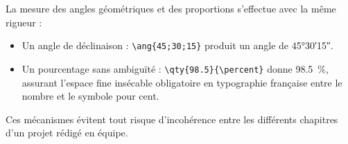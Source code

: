 La mesure des angles géométriques et des proportions s'effectue avec la même rigueur :
\begin{itemize}
  \item Un angle de déclinaison : \texttt{\textbackslash ang\{45;30;15\}} produit un angle de \ang{45;30;15}.
  \item Un pourcentage sans ambiguïté : \texttt{\textbackslash qty\{98.5\}\{\textbackslash percent\}} donne \qty{98.5}{\percent}, assurant l'espace fine insécable obligatoire en typographie française entre le nombre et le symbole pour cent.
\end{itemize}
Ces mécanismes évitent tout risque d'incohérence entre les différents chapitres d'un projet rédigé en équipe.

